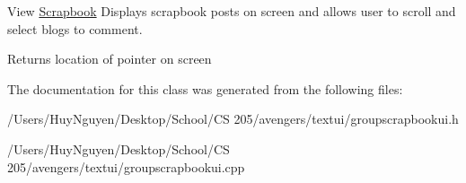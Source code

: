 View \hyperlink{classScrapbook}{Scrapbook} Displays scrapbook posts on screen and allows user to scroll and select blogs to comment. 

\begin{DoxyReturn}{Returns}
location of pointer on screen 
\end{DoxyReturn}


The documentation for this class was generated from the following files\+:\begin{DoxyCompactItemize}
\item 
/\+Users/\+Huy\+Nguyen/\+Desktop/\+School/\+C\+S 205/avengers/textui/groupscrapbookui.\+h\item 
/\+Users/\+Huy\+Nguyen/\+Desktop/\+School/\+C\+S 205/avengers/textui/groupscrapbookui.\+cpp\end{DoxyCompactItemize}
